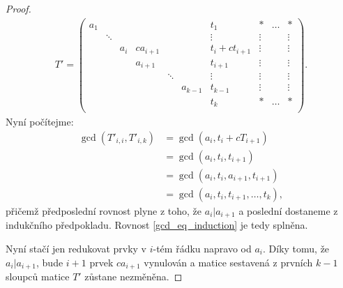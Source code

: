 \begin{proof}
\begin{align*}
T' =
    \left(
    \begin{array}{ccccccc|ccc}
        a_1 &        &     &          &        &         & t_1              & \ast   & \hdots & \ast   \\
            & \ddots &     &          &        &         & \vdots           & \vdots &        & \vdots \\
            &        & a_i & ca_{i+1} &        &         & t_{i} + ct_{i+1} & \vdots &        & \vdots \\
            &        &     & a_{i+1}  &        &         & t_{i+1}          & \vdots &        & \vdots \\
            &        &     &          & \ddots &         & \vdots           & \vdots &        & \vdots \\
            &        &     &          &        & a_{k-1} & t_{k-1}          & \vdots &        & \vdots \\
            &        &     &          &        &         & t_k              & \ast   & \hdots & \ast   \\
    \end{array}
    \right)
.
\end{align*}
Nyní počítejme:
\begin{align*}
    \gcd(T'_{i,i}, T'_{i,k}) &= \gcd(a_i, t_{i} + cT_{i+1})  \\
                             &= \gcd(a_i, t_{i}, t_{i+1}) \\
                             &= \gcd(a_i, t_{i}, a_{i+1}, t_{i+1}) \\
                             &= \gcd(a_i, t_{i}, t_{i+1},\dots,t_{k}),
\end{align*}
přičemž předposlední rovnost plyne z toho, že $ a_i \vert a_{i+1} $ a
poslední dostaneme z indukčního předpokladu. Rovnost \ref{gcd_eq_induction} je
tedy splněna.

Nyní stačí jen redukovat prvky v $ i $-tém řádku napravo od $ a_i $. Díky tomu,
že $ a_i \vert a_{i+1} $, bude $ i + 1 $ prvek $ ca_{i+1} $ vynulován a
matice sestavená z prvních $ k - 1 $ sloupců matice $ T' $ zůstane nezměněna.
\end{proof}

